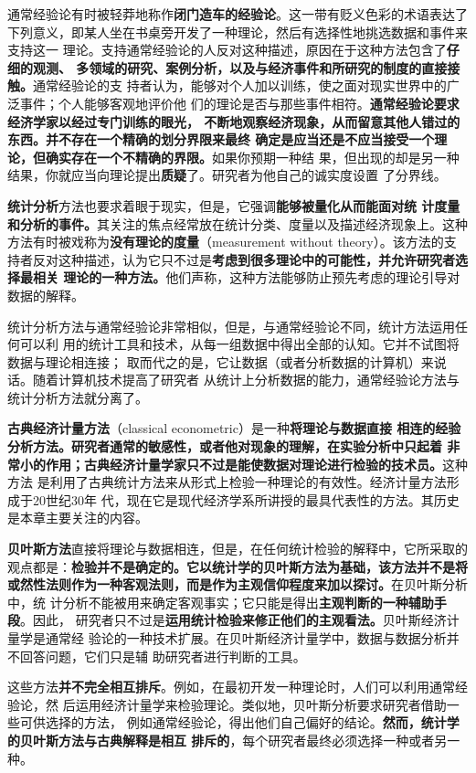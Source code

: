 通常经验论有时被轻莽地称作\textbf{闭门造车的经验论}。这一带有贬义色彩的术语表达了
下列意义，即某人坐在书桌旁开发了一种理论，然后有选择性地挑选数据和事件来支持这一
理论。支持通常经验论的人反对这种描述，原因在于这种方法包含了\textbf{仔细的观测、
  多领域的研究、案例分析，以及与经济事件和所研究的制度的直接接触。}通常经验论的支
持者认为，能够对个人加以训练，使之面对现实世界中的广泛事件；个人能够客观地评价他
们的理论是否与那些事件相符。\textbf{通常经验论要求经济学家以经过专门训练的眼光，
  不断地观察经济现象，从而留意其他人错过的东西。并不存在一个精确的划分界限来最终
  确定是应当还是不应当接受一个理论，但确实存在一个不精确的界限。}如果你预期一种结
果，但出现的却是另一种结果，你就应当向理论提出\textbf{质疑}了。研究者为他自己的诚实度设置
了分界线。

\textbf{统计分析}方法也要求着眼于现实，但是，它强调\textbf{能够被量化从而能面对统
  计度量和分析的事件。}其关注的焦点经常放在统计分类、度量以及描述经济现象上。这种
方法有时被戏称为\textbf{没有理论的度量}（measurement without theory）。该方法的支
持者反对这种描述，认为它只不过是\textbf{考虑到很多理论中的可能性，并允许研究者选择最相关
理论的一种方法。}他们声称，这种方法能够防止预先考虑的理论引导对数据的解释。

统计分析方法与通常经验论非常相似，但是，与通常经验论不同，统计方法运用任何可以利
用的统计工具和技术，从每一组数据中得出全部的认知。它并不试图将数据与理论相连接；
取而代之的是，它让数据（或者分析数据的计算机）来说话。随着计算机技术提高了研究者
从统计上分析数据的能力，通常经验论方法与统计分析方法就分离了。

\textbf{古典经济计量方法}（classical econometric）是一种\textbf{将理论与数据直接
  相连的经验分析方法。研究者通常的敏感性，或者他对现象的理解，在实验分析中只起着
  非常小的作用；古典经济计量学家只不过是能使数据对理论进行检验的技术员。}这种方法
是利用了古典统计方法来从形式上检验一种理论的有效性。经济计量方法形成于20世纪30年
代，现在它是现代经济学系所讲授的最具代表性的方法。其历史是本章主要关注的内容。

\textbf{贝叶斯方法}直接将理论与数据相连，但是，在任何统计检验的解释中，它所采取的
观点都是：\textbf{检验并不是确定的。它以统计学的贝叶斯方法为基础，该方法并不是将
  或然性法则作为一种客观法则，而是作为主观信仰程度来加以探讨。}在贝叶斯分析中，统
计分析不能被用来确定客观事实；它只能是得出\textbf{主观判断的一种辅助手段}。因此，
研究者只不过是\textbf{运用统计检验来修正他们的主观看法。}贝叶斯经济计量学是通常经
验论的一种技术扩展。在贝叶斯经济计量学中，数据与数据分析并不回答问题，它们只是辅
助研究者进行判断的工具。

这些方法\textbf{并不完全相互排斥}。例如，在最初开发一种理论时，人们可以利用通常经验论，然
后运用经济计量学来检验理论。类似地，贝叶斯分析要求研究者借助一些可供选择的方法，
例如通常经验论，得出他们自己偏好的结论。\textbf{然而，统计学的贝叶斯方法与古典解释是相互
排斥的}，每个研究者最终必须选择一种或者另一种。

